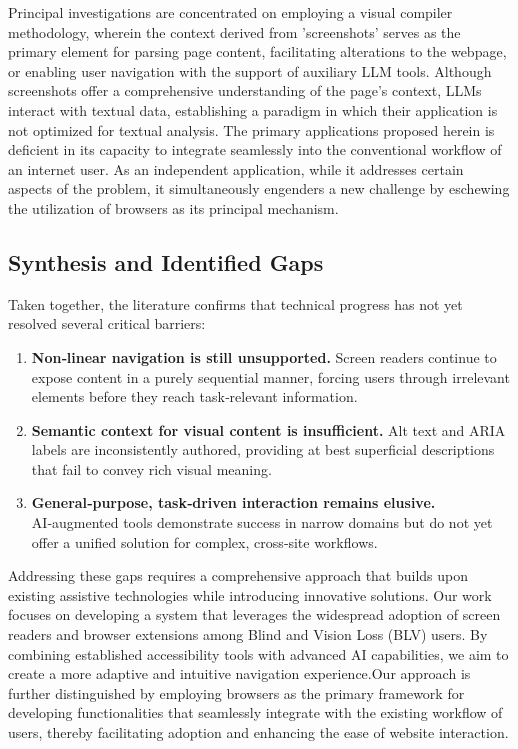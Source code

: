 \documentclass[conference]{IEEEtran}
\begin{document}
Principal investigations are concentrated on employing a visual compiler methodology, wherein the context derived from 'screenshots' serves as the primary element for parsing page content, facilitating alterations to the webpage, or enabling user navigation with the support of auxiliary LLM tools. Although screenshots offer a comprehensive understanding of the page's context, LLMs interact with textual data, establishing a paradigm in which their application is not optimized for textual analysis. The primary applications proposed herein is deficient in its capacity to integrate seamlessly into the conventional workflow of an internet user. As an independent application, while it addresses certain aspects of the problem, it simultaneously engenders a new challenge by eschewing the utilization of browsers as its principal mechanism. \cite{he2024webvoyager, mehendale2024, prakash2024}

\subsection*{Synthesis and Identified Gaps}

Taken together, the literature confirms that technical progress has not yet resolved several critical barriers:

\begin{enumerate}
\item \textbf{Non‑linear navigation is still unsupported.} Screen readers continue to expose content in a purely sequential manner, forcing users through irrelevant elements before they reach task‑relevant information. \cite{Babu_2013} 
\item \textbf{Semantic context for visual content is insufficient.} Alt text and ARIA labels are inconsistently authored, providing at best superficial descriptions that fail to convey rich visual meaning. \cite{Chintalapati_2022}
\item \textbf{General‑purpose, task‑driven interaction remains elusive.} AI‑augmented tools demonstrate success in narrow domains but do not yet offer a unified solution for complex, cross‑site workflows.\cite{prakash2024,kodandaram2024,mehendale2024} 
\end{enumerate}

Addressing these gaps requires a comprehensive approach that builds upon existing assistive technologies while introducing innovative solutions. Our work focuses on developing a system that leverages the widespread adoption of screen readers and browser extensions among Blind and Vision Loss (BLV) users. By combining established accessibility tools with advanced AI capabilities, we aim to create a more adaptive and intuitive navigation experience.Our approach is further distinguished by employing browsers as the primary framework for developing functionalities that seamlessly integrate with the existing workflow of users, thereby facilitating adoption and enhancing the ease of website interaction. 
\end{document}
